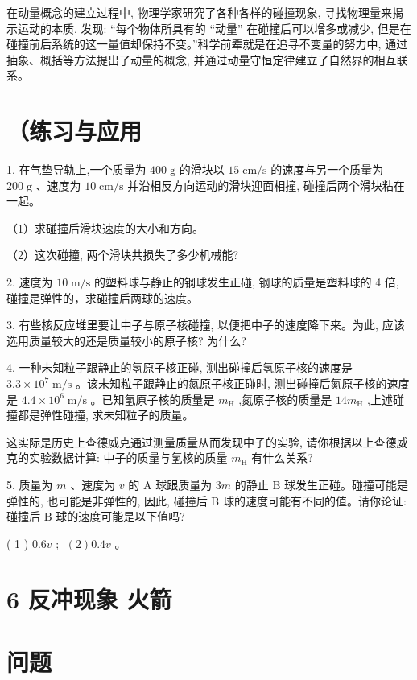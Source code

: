 \documentclass[10pt]{article}
\begin{document}
在动量概念的建立过程中, 物理学家研究了各种各样的碰撞现象, 寻找物理量来揭示运动的本质, 发现: “每个物体所具有的 “动量” 在碰撞后可以增多或减少, 但是在碰撞前后系统的这一量值却保持不变。”科学前辈就是在追寻不变量的努力中, 通过抽象、概括等方法提出了动量的概念, 并通过动量守恒定律建立了自然界的相互联系。

\section*{（练习与应用}

1. 在气垫导轨上,一个质量为 \({400}\mathrm{\;g}\) 的滑块以 \({15}\mathrm{\;{cm}}/\mathrm{s}\) 的速度与另一个质量为 \({200}\mathrm{\;g}\) 、速度为 \({10}\mathrm{\;{cm}}/\mathrm{s}\) 并沿相反方向运动的滑块迎面相撞, 碰撞后两个滑块粘在一起。

（1）求碰撞后滑块速度的大小和方向。

（2）这次碰撞, 两个滑块共损失了多少机械能?

2. 速度为 \({10}\mathrm{\;m}/\mathrm{s}\) 的塑料球与静止的钢球发生正碰, 钢球的质量是塑料球的 4 倍, 碰撞是弹性的，求碰撞后两球的速度。

3. 有些核反应堆里要让中子与原子核碰撞, 以便把中子的速度降下来。为此, 应该选用质量较大的还是质量较小的原子核? 为什么?

4. 一种未知粒子跟静止的氢原子核正碰, 测出碰撞后氢原子核的速度是 \({3.3} \times {10}^{7}\mathrm{\;m}/\mathrm{s}\) 。该未知粒子跟静止的氮原子核正碰时, 测出碰撞后氮原子核的速度是 \({4.4} \times {10}^{6}\mathrm{\;m}/\mathrm{s}\) 。已知氢原子核的质量是 \({m}_{\mathrm{H}}\) ,氮原子核的质量是 \({14}{m}_{\mathrm{H}}\) ,上述碰撞都是弹性碰撞, 求未知粒子的质量。

这实际是历史上查德威克通过测量质量从而发现中子的实验, 请你根据以上查德威克的实验数据计算: 中子的质量与氢核的质量 \({m}_{\mathrm{H}}\) 有什么关系?

5. 质量为 \(m\) 、速度为 \(v\) 的 \(\mathrm{A}\) 球跟质量为 \({3m}\) 的静止 \(\mathrm{B}\) 球发生正碰。碰撞可能是弹性的, 也可能是非弹性的, 因此, 碰撞后 B 球的速度可能有不同的值。请你论证: 碰撞后 \(\mathrm{B}\) 球的速度可能是以下值吗?

( 1 ) \({0.6v}\) ; \(\;\left( 2\right) {0.4v}\) 。

\section*{6 反冲现象 火箭}

\section*{问题}
\end{document}

